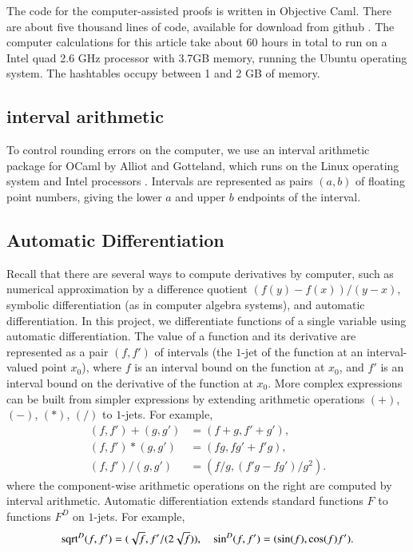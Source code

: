 The code for the computer-assisted proofs is written in Objective
Caml.  There are about five thousand lines of code, available for
download from github \cite{Git}.  The computer calculations for this
article take about 60 hours in total to run on a Intel quad 2.6 GHz
processor with 3.7GB memory, running the Ubuntu operating system.  The
hashtables occupy between  1 and 2 GB of memory.


\subsection{interval arithmetic}

To control rounding errors on the computer, we use an interval
arithmetic package for OCaml by Alliot and Gotteland, which runs on
the Linux operating system and Intel processors \cite{All}.  Intervals
are represented as pairs $(a,b)$ of floating point numbers, giving the
lower $a$ and upper $b$ endpoints of the interval.


\subsection{Automatic Differentiation}

Recall that there are several ways to compute derivatives by computer,
such as numerical approximation by a difference quotient
$(f(y)-f(x))/(y-x)$, symbolic differentiation (as in computer algebra
systems), and automatic differentiation.  In this project, we
differentiate functions of a single variable using automatic
differentiation.  The value of a function and its derivative are
represented as a pair $(f,f')$ of intervals (the $1$-jet of the
function at an interval-valued point $x_0$), where $f$ is an interval
bound on the function at $x_0$, and $f'$ is an interval bound on the
derivative of the function at $x_0$.  More complex expressions can be
built from simpler expressions by extending arithmetic operations
$(+)$, $(-)$, $(*)$, $(/)$ to $1$-jets.  For example,
\begin{align*}
(f,f') + (g,g') &= (f+g,f'+g'),\\
(f,f') * (g,g') &= (f g,f g' + f' g),\\
(f,f') / (g,g') &= (f / g, (f' g - f g')/g^2).
\end{align*}
where the component-wise arithmetic operations on the right are
computed by interval arithmetic.  Automatic differentiation extends
standard functions $F$ to functions $F^D$ on $1$-jets.
For example,
\[
{\operatorname{sqrt}}^D(f,f') = (\sqrt{f}, f'/(2\sqrt{f})),\quad 
\sin^D (f,f') = (\sin(f), \cos(f) f').
\]

